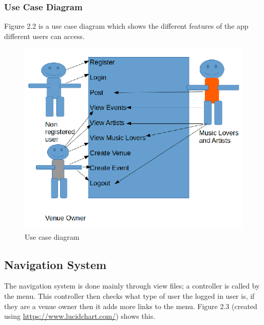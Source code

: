 \subsubsection{Use Case Diagram}
Figure 2.2 is a use case diagram which shows the different features of the app different users can access.
\begin{center} 
\begin{figure}[H]
\includegraphics[width=\textwidth,height=\textheight,keepaspectratio]{images/usecase}
\caption{Use case diagram}
\end{figure}
\end{center}

\subsection{Navigation System}
The navigation system is done mainly through view files; a controller is called by the menu. This controller then checks what type of user the logged in user is, if they are a venue owner then it adds more links to the menu. Figure 2.3 (created using \url{https://www.lucidchart.com/}) shows this.

